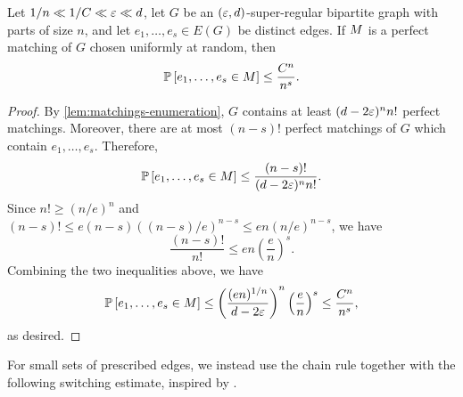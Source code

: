 \documentclass[11pt]{amsart}
\begin{document}
\begin{lemma}\label{lem:matchings-many-edge-spread}
    Let $1 / n \ll 1 / C \ll \varepsilon \ll d$, let $G$ be an $(\varepsilon, d)$-super-regular bipartite graph with parts of size $n$,  and let $e_1, \dots, e_s \in E(G)$ be distinct edges.
    If $M$ is a perfect matching of $G$ chosen uniformly at random, then 
    \begin{equation*}
         \mathbb P\left[e_1, \dots, e_s \in M\right]  \leq \frac{C^n}{n^s}.
    \end{equation*}
\end{lemma}
\begin{proof}
    By \cref{lem:matchings-enumeration}, $G$ contains at least $(d - 2\varepsilon)^n n!$ perfect matchings.  Moreover, there are at most $(n - s)!$ perfect matchings of $G$ which contain $e_1, \dots, e_s$.  Therefore,
    \begin{equation*}
         \mathbb P\left[e_1, \dots, e_s \in M\right]  \leq \frac{(n - s)!}{(d - 2\varepsilon)^n n!}.
    \end{equation*}
    Since $n! \geq (n / e)^n$ and $(n - s)! \leq e(n - s)((n - s) / e)^{n - s} \leq en(n / e)^{n - s}$, we have
    \begin{equation*}
        \frac{(n - s)!}{n!} \leq en\left(\frac{e}{n}\right)^s.
    \end{equation*}
    Combining the two inequalities above, we have
    \begin{equation*}
         \mathbb P\left[e_1, \dots, e_s \in M\right]  \leq \left(\frac{(en)^{1/n}}{d - 2\varepsilon}\right)^n\left(\frac{e}{n}\right)^s \leq \frac{C^n}{n^s},
    \end{equation*}
    as desired.
\end{proof}

For small sets of prescribed edges, we instead use the chain rule together
with the following switching estimate, inspired by
\cite[Theorem 4.3]{KKOT19}.
\end{document}
